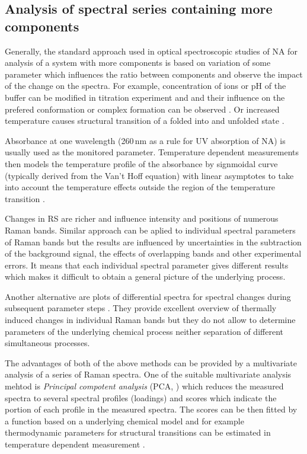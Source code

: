 \subsection{Analysis of spectral series containing more components}

Generally, the standard approach used in optical spectroscopic studies of NA
for analysis of a system with more components is based on variation of some
parameter which influences the ratio between components and observe the
impact of the change on the spectra.
For example, concentration of ions or pH of the buffer can be modified in
titration experiment and and their influence on the prefered conformation or
complex formation can be observed
\parencite{Klener2015}.
Or increased temperature causes structural transition of a folded into and
unfolded state
\parencite{Klener2021}.

Absorbance at one wavelength (260\,nm as a rule for UV absorption of NA) is
usually used as the monitored parameter.
Temperature dependent measurements then models the temperature profile of the
absorbance by signmoidal curve (typically derived from the Van't Hoff equation)
with linear asymptotes to take into account the temperature effects outside
the region of the temperature transition
\parencite{%
	Owczarzy1997,%
	Owczarzy2005,%
	Mergny2009%
}.

Changes in RS are richer and influence intensity and positions of numerous
Raman bands.
Similar approach can be aplied to individual spectral parameters of Raman
bands
\parencite{%
	Duguid1996,%
	Mukerji1996,%
	Mercier1999,%
	Baumruk2001,%
	Movileanu2002a,%
	Knee2008%
}
but the results are influenced by uncertainties in the subtraction of the
background signal, the effects of overlapping bands and other experimental
errors.
It means that each individual spectral parameter gives different results which
makes it difficult to obtain a general picture of the underlying process.

Another alternative are plots of differential spectra for spectral changes
during subsequent parameter steps
\parencite{%
	Duguid1996,%
	Baumruk2001,%
	Chan1997,%
	Movileanu1999,%
	Movileanu2002%
}.
They provide excellent overview of thermally induced changes in individual
Raman bands but they do not allow to determine parameters of the underlying
chemical process neither separation of different simultaneous processes.

The advantages of both of the above methods can be provided by a multivariate
analysis of a series of Raman spectra.
One of the suitable multivariate analysis mehtod is
\emph{Principal compotent analysis} (PCA,
\cite{%
	Wold1987,%
	Malinowski2002%
})
which reduces the measured spectra to several spectral profiles (loadings) and
scores which indicate the portion of each profile in the measured spectra.
The scores can be then fitted by a function based on a underlying chemical
model and for example thermodynamic parameters for structural transitions
can be estimated in temperature dependent measurement
\parencite{Nemecek2013}.

